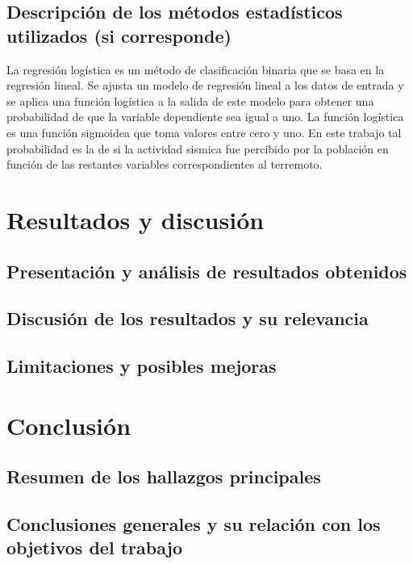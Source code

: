 \documentclass[a4paper]{report}
\begin{document}
\section{Descripción de los métodos estadísticos utilizados (si corresponde)}

La regresión logística es un método de clasificación binaria que se basa en la regresión lineal.
Se ajusta un modelo de regresión lineal a los datos de entrada y se aplica una función logística a la salida de este modelo para obtener una probabilidad de que la variable dependiente sea igual a uno.
La función logística es una función sigmoidea que toma valores entre cero y uno.
En este trabajo tal probabilidad es la de si la actividad sismica fue percibido por la población en función de las restantes variables correspondientes al terremoto.



\chapter{Resultados y discusión}

\section{Presentación y análisis de resultados obtenidos}

\section{Discusión de los resultados y su relevancia}

\section{Limitaciones y posibles mejoras}





\chapter{Conclusión}

\section{Resumen de los hallazgos principales}

\section{Conclusiones generales y su relación con los objetivos del trabajo}
\end{document}
